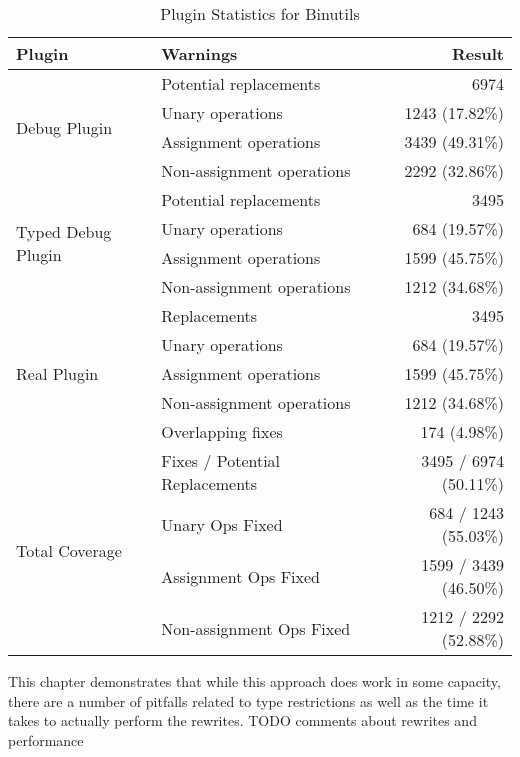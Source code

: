\begin{table}[ht]
\centering
\caption{Plugin Statistics for Binutils}
\label{tab:binutils}
\begin{tabular}{@{}llr@{}}
\toprule
\textbf{Plugin} & \textbf{Warnings} & \textbf{Result} \\
\midrule

\multirow{4}{*}{Debug Plugin} 
  & Potential replacements         & 6974 \\
  & Unary operations               & 1243 (17.82\%) \\
  & Assignment operations          & 3439 (49.31\%) \\
  & Non-assignment operations      & 2292 (32.86\%) \\
\midrule

\multirow{4}{*}{Typed Debug Plugin} 
  & Potential replacements         & 3495 \\
  & Unary operations               & 684 (19.57\%) \\
  & Assignment operations          & 1599 (45.75\%) \\
  & Non-assignment operations      & 1212 (34.68\%) \\
\midrule

\multirow{5}{*}{Real Plugin} 
  & Replacements                   & 3495 \\
  & Unary operations               & 684 (19.57\%) \\
  & Assignment operations          & 1599 (45.75\%) \\
  & Non-assignment operations      & 1212 (34.68\%) \\
  & Overlapping fixes              & 174 (4.98\%) \\
\midrule\midrule

\multirow{4}{*}{Total Coverage} 
  & Fixes / Potential Replacements & 3495 / 6974 (50.11\%) \\
  & Unary Ops Fixed                & 684 / 1243 (55.03\%) \\
  & Assignment Ops Fixed           & 1599 / 3439 (46.50\%) \\
  & Non-assignment Ops Fixed       & 1212 / 2292 (52.88\%) \\
\bottomrule
\end{tabular}
\end{table}

This chapter demonstrates that while this approach does work in some capacity, there are a number of pitfalls related to type restrictions as well as the time it takes to actually perform the rewrites. TODO comments about rewrites and performance